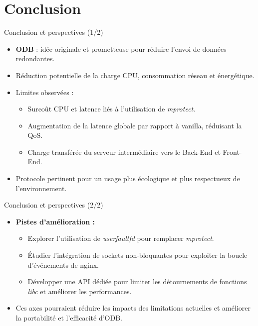 \documentclass[aspectratio=43,8pt]{beamer}
\begin{document}
\part{Conclusion}
\begin{frame}{Conclusion et perspectives (1/2)}
\begin{card}
    \begin{itemize}
        \item \textbf{ODB} : idée originale et prometteuse pour réduire l'envoi de données redondantes.
        \item Réduction potentielle de la charge CPU, consommation réseau et énergétique.
        \item Limites observées :
        \begin{itemize}
            \item Surcoût CPU et latence liés à l'utilisation de \textit{mprotect}.
            \item Augmentation de la latence globale par rapport à vanilla, réduisant la QoS.
            \item Charge transférée du serveur intermédiaire vers le Back-End et Front-End.
        \end{itemize}
        \item Protocole pertinent pour un usage plus écologique et plus respectueux de l’environnement.
    \end{itemize}
\end{card}
\end{frame}

\begin{frame}{Conclusion et perspectives (2/2)}
\begin{card}
    \begin{itemize}
        \item \textbf{Pistes d’amélioration :}
        \begin{itemize}
            \item Explorer l’utilisation de \textit{userfaultfd} pour remplacer \textit{mprotect}.
            \item Étudier l’intégration de sockets non-bloquantes pour exploiter la boucle d’événements de nginx.
            \item Développer une API dédiée pour limiter les détournements de fonctions \textit{libc} et améliorer les performances.
        \end{itemize}
        \item Ces axes pourraient réduire les impacts des limitations actuelles et améliorer la portabilité et l’efficacité d'ODB.
    \end{itemize}
\end{card}
\end{frame}
\end{document}
